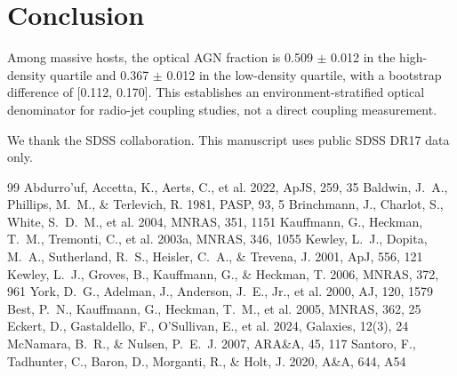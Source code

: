 \documentclass[twocolumn]{aastex631}
\begin{document}
\section{Conclusion}\label{sec:conclusion}
Among massive hosts, the optical AGN fraction is 0.509 $\pm$ 0.012 in the high-density quartile and 0.367 $\pm$ 0.012 in the low-density quartile, with a bootstrap difference of [0.112, 0.170]. This establishes an environment-stratified optical denominator for radio-jet coupling studies, not a direct coupling measurement.

\begin{acknowledgments}
We thank the SDSS collaboration. This manuscript uses public SDSS DR17 data only.
\end{acknowledgments}
\begin{thebibliography}{99}
 Abdurro'uf, Accetta, K., Aerts, C., et al. 2022, ApJS, 259, 35
 Baldwin, J.~A., Phillips, M.~M., \& Terlevich, R. 1981, PASP, 93, 5
 Brinchmann, J., Charlot, S., White, S.~D.~M., et al. 2004, MNRAS, 351, 1151
 Kauffmann, G., Heckman, T.~M., Tremonti, C., et al. 2003a, MNRAS, 346, 1055
 Kewley, L.~J., Dopita, M.~A., Sutherland, R.~S., Heisler, C.~A., \& Trevena, J. 2001, ApJ, 556, 121
 Kewley, L.~J., Groves, B., Kauffmann, G., \& Heckman, T. 2006, MNRAS, 372, 961
 York, D.~G., Adelman, J., Anderson, J.~E., Jr., et al. 2000, AJ, 120, 1579
 Best, P.~N., Kauffmann, G., Heckman, T.~M., et al. 2005, MNRAS, 362, 25
 Eckert, D., Gastaldello, F., O'Sullivan, E., et al. 2024, Galaxies, 12(3), 24
 McNamara, B.~R., \& Nulsen, P.~E.~J. 2007, ARA\&A, 45, 117
 Santoro, F., Tadhunter, C., Baron, D., Morganti, R., \& Holt, J. 2020, A\&A, 644, A54
\end{thebibliography}
\end{document}
